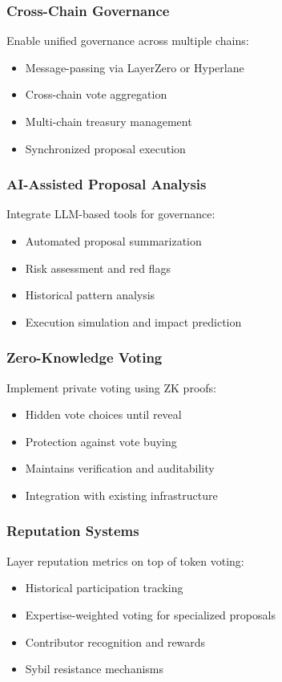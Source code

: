 \documentclass[11pt,a4paper]{article}
\begin{document}
\subsubsection{Cross-Chain Governance}

Enable unified governance across multiple chains:
\begin{itemize}
    \item Message-passing via LayerZero or Hyperlane
    \item Cross-chain vote aggregation
    \item Multi-chain treasury management
    \item Synchronized proposal execution
\end{itemize}

\subsubsection{AI-Assisted Proposal Analysis}

Integrate LLM-based tools for governance:
\begin{itemize}
    \item Automated proposal summarization
    \item Risk assessment and red flags
    \item Historical pattern analysis
    \item Execution simulation and impact prediction
\end{itemize}

\subsubsection{Zero-Knowledge Voting}

Implement private voting using ZK proofs:
\begin{itemize}
    \item Hidden vote choices until reveal
    \item Protection against vote buying
    \item Maintains verification and auditability
    \item Integration with existing infrastructure
\end{itemize}

\subsubsection{Reputation Systems}

Layer reputation metrics on top of token voting:
\begin{itemize}
    \item Historical participation tracking
    \item Expertise-weighted voting for specialized proposals
    \item Contributor recognition and rewards
    \item Sybil resistance mechanisms
\end{itemize}
\end{document}
